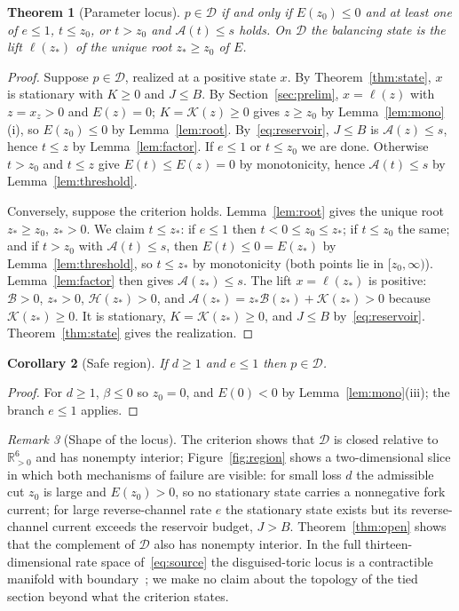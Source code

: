 \documentclass[11pt,a4paper]{article}
\theoremstyle{plain}
\newtheorem{theorem}{Theorem}[section]
\newtheorem{corollary}[theorem]{Corollary}
\theoremstyle{definition}
\theoremstyle{remark}
\newtheorem{remark}[theorem]{Remark}
\newcommand{\R}{\mathbb{R}}
\newcommand{\Rp}{\R_{>0}}
\newcommand{\DT}{\mathcal{D}}
\newcommand{\rA}{\mathcal{A}}
\newcommand{\rB}{\mathcal{B}}
\newcommand{\rK}{\mathcal{K}}
\newcommand{\rH}{\mathcal{H}}
\begin{document}
\begin{theorem}[Parameter locus]\label{thm:locus}
$p\in\DT$ if and only if $E(z_0)\le0$ and at least one of $e\le1$, $t\le z_0$, or $t>z_0$ and $\rA(t)\le s$ holds. On $\DT$ the balancing state is the lift $\ell(z_*)$ of the unique root $z_*\ge z_0$ of $E$.
\end{theorem}
\begin{proof}
Suppose $p\in\DT$, realized at a positive state $x$. By Theorem~\ref{thm:state}, $x$ is stationary with $K\ge0$ and $J\le B$. By Section~\ref{sec:prelim}, $x=\ell(z)$ with $z=x_z>0$ and $E(z)=0$; $K=\rK(z)\ge0$ gives $z\ge z_0$ by Lemma~\ref{lem:mono}(i), so $E(z_0)\le0$ by Lemma~\ref{lem:root}. By~\eqref{eq:reservoir}, $J\le B$ is $\rA(z)\le s$, hence $t\le z$ by Lemma~\ref{lem:factor}. If $e\le1$ or $t\le z_0$ we are done. Otherwise $t>z_0$ and $t\le z$ give $E(t)\le E(z)=0$ by monotonicity, hence $\rA(t)\le s$ by Lemma~\ref{lem:threshold}.

Conversely, suppose the criterion holds. Lemma~\ref{lem:root} gives the unique root $z_*\ge z_0$, $z_*>0$. We claim $t\le z_*$: if $e\le1$ then $t<0\le z_0\le z_*$; if $t\le z_0$ the same; and if $t>z_0$ with $\rA(t)\le s$, then $E(t)\le0=E(z_*)$ by Lemma~\ref{lem:threshold}, so $t\le z_*$ by monotonicity (both points lie in $[z_0,\infty)$). Lemma~\ref{lem:factor} then gives $\rA(z_*)\le s$. The lift $x=\ell(z_*)$ is positive: $\rB>0$, $z_*>0$, $\rH(z_*)>0$, and $\rA(z_*)=z_*\rB(z_*)+\rK(z_*)>0$ because $\rK(z_*)\ge0$. It is stationary, $K=\rK(z_*)\ge0$, and $J\le B$ by~\eqref{eq:reservoir}. Theorem~\ref{thm:state} gives the realization.
\end{proof}

\begin{corollary}[Safe region]\label{cor:safe}
If $d\ge1$ and $e\le1$ then $p\in\DT$.
\end{corollary}
\begin{proof}
For $d\ge1$, $\beta\le0$ so $z_0=0$, and $E(0)<0$ by Lemma~\ref{lem:mono}(iii); the branch $e\le1$ applies.
\end{proof}

\begin{remark}[Shape of the locus]\label{rem:shape}
The criterion shows that $\DT$ is closed relative to $\Rp^6$ and has nonempty interior; Figure~\ref{fig:region} shows a two-dimensional slice in which both mechanisms of failure are visible: for small loss $d$ the admissible cut $z_0$ is large and $E(z_0)>0$, so no stationary state carries a nonnegative fork current; for large reverse-channel rate $e$ the stationary state exists but its reverse-channel current exceeds the reservoir budget, $J>B$. Theorem~\ref{thm:open} shows that the complement of $\DT$ also has nonempty interior. In the full thirteen-dimensional rate space of~\eqref{eq:source} the disguised-toric locus is a contractible manifold with boundary~\cite{Boros2026}; we make no claim about the topology of the tied section beyond what the criterion states.
\end{remark}
\end{document}
